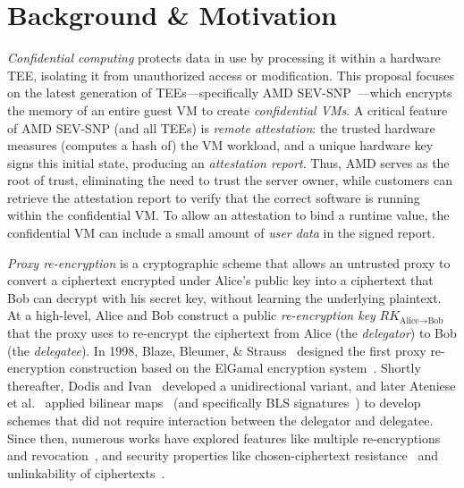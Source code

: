 \section{Background \& Motivation}
\label{sec:background}

%
\emph{Confidential computing} protects data in use by processing it within a
hardware TEE, isolating it from unauthorized access or modification.
%
This proposal focuses on the latest generation of TEEs---specifically AMD
SEV-SNP~\cite{amd-sev_snp}---which encrypts the memory of an entire guest VM to
create \emph{confidential VMs}.
%
A critical feature of AMD SEV-SNP (and all TEEs) is \emph{remote attestation}:
the trusted hardware measures (computes a hash of) the VM workload, and a
unique hardware key signs this initial state, producing an \emph{attestation
report}.
%
Thus, AMD serves as the root of trust, eliminating the need to trust the server
owner, while customers can retrieve the attestation report to verify that the
correct software is running within the confidential VM\@.
%
To allow an attestation to bind a runtime value, the confidential VM can
include a small amount of \emph{user data} in the signed report.
%
%


%
%
\emph{Proxy re-encryption} is a cryptographic scheme that allows an untrusted
proxy to convert a ciphertext encrypted under Alice's public key into a
ciphertext that Bob can decrypt with his secret key, without learning the
underlying plaintext.
%
At a high-level, Alice and Bob construct a public \emph{re-encryption key}
$RK_{\text{Alice}\rightarrow\text{Bob}}$ that
the proxy uses to re-encrypt the ciphertext from Alice (the \emph{delegator}) to Bob
(the \emph{delegatee}).
%
In 1998, Blaze, Bleumer, \& Strauss~\cite{98-eurocrypt-proxy_cryptography}
designed the first proxy re-encryption construction based on the ElGamal
encryption system~\cite{85-toit-elgamal}.
%
Shortly thereafter, Dodis and Ivan~\cite{03-ndss-proxy_cryptography_revisited}
developed a unidirectional variant, and later Ateniese et
al.~\cite{05-ndss-improved_proxy_reencryption} applied bilinear
maps~\cite{01-crypto-ibe_weil_pairing} (and specifically BLS
signatures~\cite{03-eurocrypt-aggregate_signatures_bilinear_maps}) to develop
schemes that did not require interaction between the delegator and delegatee.
%
Since then, numerous works have explored features like multiple
re-encryptions~\cite{17-tops-fast_proxy_re_encryption} and
revocation~\cite{12-crypto-dynamic_credentials_and_delegation_for_abe}, and
security properties like chosen-ciphertext
resistance~\cite{07-ccs-cca_proxy_re_encryption} and
unlinkability of ciphertexts~\cite{19-acisp-pcs_proxy_reencryption}.


